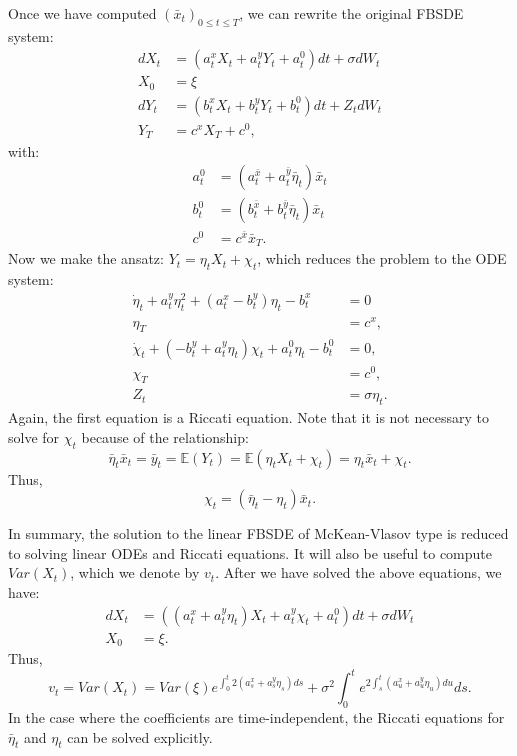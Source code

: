 \documentclass[11pt]{article}
\begin{document}
\begin{appendices}
Once we have computed $(\bar{x}_t)_{0\leq t\leq T}$, we can rewrite the original FBSDE system:
\begin{equation*}
\begin{split}
        dX_t&=\left(a^x_tX_t+a^y_tY_t+a^0_t\right)dt+\sigma dW_t \\
        X_0&=\xi \\
        dY_t&=\left(b^x_tX_t+b^y_tY_t+b^0_t\right)dt +Z_t dW_t \\
        Y_T&=c^xX_T+c^0,
\end{split}
\end{equation*}
with:
\begin{equation*}
\begin{split}
    a^0_t&=(a^{\bar{x}}_t+a^{\bar{y}}_t \bar{\eta}_t)\bar{x}_t \\
    b^0_t&=(b^{\bar{x}}_t+b^{\bar{y}}_t \bar{\eta}_t)\bar{x}_t\\
    c^0&=c^{\bar{x}}\bar{x}_T.
\end{split}
\end{equation*}
Now we make the ansatz: $Y_t=\eta_t X_t+\chi_t$, which reduces the problem to the ODE system:
\begin{equation*}
\begin{split}
    \dot{\eta}_t+a^y_t\eta_t^2+(a^x_t-b^y_t)\eta_t-b^x_t&=0 \\
    \eta_T&=c^x, \\
    \dot{\chi}_t+(-b^y_t+a^y_t\eta_t)\chi_t+a^0_t\eta_t-b^0_t&=0, \\
    \chi_T&=c^0, \\
    Z_t&=\sigma \eta_t.
\end{split}
\end{equation*}
Again, the first equation is a Riccati equation. Note that it is not necessary to solve for $\chi_t$ because of the relationship:
\begin{equation*}
    \bar{\eta}_t\bar{x}_t=\bar{y}_t=\mathbb{E}(Y_t)=\mathbb{E}(\eta_t X_t+\chi_t)=\eta_t \bar{x}_t+\chi_t.
\end{equation*}
Thus,
\begin{equation*}
    \chi_t=(\bar{\eta}_t-\eta_t)\bar{x}_t.
\end{equation*}

In summary, the solution to the linear FBSDE of McKean-Vlasov type is reduced to solving linear ODEs and Riccati equations. It will also be useful to compute $Var(X_t)$, which we denote by $v_t$. After we have solved the above equations, we have:
\begin{equation*}
\begin{split}
        dX_t&=\left((a^x_t+a^y_t \eta_t)X_t+a^y_t \chi_t+a^0_t\right)dt+\sigma dW_t \\
        X_0&=\xi.
\end{split}
\end{equation*}
Thus,
\begin{equation*}
    v_t=Var(X_t)=Var(\xi)e^{\int_0^t 2(a^x_s+a^y_s\eta_s)ds}+\sigma^2 \int_0^t e^{2 \int_s^t (a^x_u+a^y_u\eta_u) du}ds.
\end{equation*}
In the case where the coefficients are time-independent, the Riccati equations for $\bar{\eta}_t$ and $\eta_t$ can be solved explicitly.


\end{appendices}
\end{document}

